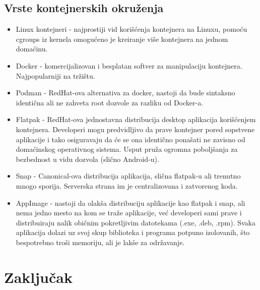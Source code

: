 \documentclass[a4paper,14pt]{article}
\begin{document}
\subsection{Vrste kontejnerskih okruženja}
\begin{itemize}
\item Linux kontejneri\cite{lxc} - najprostiji vid korišćenja kontejnera na Linuxu, pomoću cgroups iz kernela omogućeno je kreiranje više kontejnera na jednom domaćinu.
\item Docker\cite{docker} - komercijalizovan i besplatan softver za manipulaciju kontejnera. Najpopularniji na tržištu.
\item Podman\cite{podman} - RedHat-ova alternativa za docker, nastoji da bude sintaksno identična ali ne zahveta root dozvole za razliku od Docker-a.
\item Flatpak\cite{flatpak} - RedHat-ova jednostavna distribucija desktop aplikacija korišćenjem kontejnera. Developeri mogu predvidljivo da prave kontejner pored sopstvene aplikacije i tako osiguravaju da će se ona identično ponašati ne zavisno od domaćinskog operativnog sistema. Usput pruža ogromna poboljšanja za bezbednost u vidu dozvola (slično Android-u).
\item Snap\cite{snap} - Canonical-ova distribucija aplikacija, slična flatpak-u ali trenutno mnogo sporija. Serverska strana im je centralizovana i zatvorenog koda.
\item AppImage\cite{appimage} - nastoji da olakša distribuciju aplikacije kao flatpak i snap, ali nema jedno mesto na kom se traže aplikacije, već developeri sami prave i distribuiraju nalik običnim pokretljivim datotekama (.exe, .deb, .rpm). Svaka aplikacija dolazi uz svoj skup biblioteka i programa potpuno izolovanih, što bespotrebno troši memoriju, ali je lakše za održavanje.
\end{itemize}
\newpage

\section{Zaključak}
\newpage

\renewcommand\refname{Literatura}


\newpage
\end{document}
